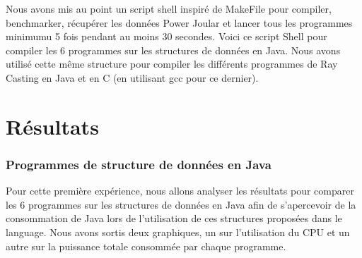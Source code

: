 \documentclass[12pt, a4paper]{report}
\begin{document}
Nous avons mis au point un script shell inspiré de MakeFile pour compiler, benchmarker, récupérer les données Power Joular et lancer tous les programmes minimumu 5 fois pendant au moins 30 secondes.
Voici ce script Shell pour compiler les 6 programmes sur les structures de données en Java. 
Nous avons utilisé cette même structure pour compiler les différents programmes de Ray Casting en Java et en C (en utilisant gcc pour ce dernier).




\chapter{\centering Résultats}

\subsection{Programmes de structure de données en Java}
Pour cette première expérience, nous allons analyser les résultats pour comparer les 6 programmes sur les structures de données en Java afin de s'apercevoir de la consommation de Java lors de l'utilisation de ces structures proposées dans le language.
Nous avons sortis deux graphiques, un sur l'utilisation du CPU et un autre sur la puissance totale consommée par chaque programme.
\end{document}
